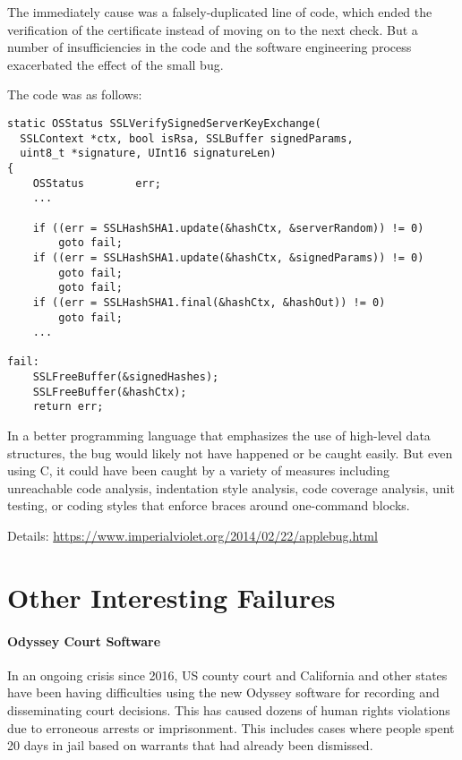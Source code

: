 The immediately cause was a falsely-duplicated line of code, which ended the verification of the certificate instead of moving on to the next check.
But a number of insufficiencies in the code and the software engineering process exacerbated the effect of the small bug.

The code was as follows:

\begin{lstlisting}
static OSStatus SSLVerifySignedServerKeyExchange(
  SSLContext *ctx, bool isRsa, SSLBuffer signedParams,
  uint8_t *signature, UInt16 signatureLen)
{
	OSStatus        err;
	...

	if ((err = SSLHashSHA1.update(&hashCtx, &serverRandom)) != 0)
		goto fail;
	if ((err = SSLHashSHA1.update(&hashCtx, &signedParams)) != 0)
		goto fail;
		goto fail;
	if ((err = SSLHashSHA1.final(&hashCtx, &hashOut)) != 0)
		goto fail;
	...

fail:
	SSLFreeBuffer(&signedHashes);
	SSLFreeBuffer(&hashCtx);
	return err;
\end{lstlisting}

In a better programming language that emphasizes the use of high-level data structures, the bug would likely not have happened or be caught easily.
But even using C, it could have been caught by a variety of measures including unreachable code analysis, indentation style analysis, code coverage analysis, unit testing, or coding styles that enforce braces around one-command blocks.
 
Details: \url{https://www.imperialviolet.org/2014/02/22/applebug.html}


\section{Other Interesting Failures}

\paragraph{Odyssey Court Software}
In an ongoing crisis since 2016, US county court and California and other states have been having difficulties using the new Odyssey software for recording and disseminating court decisions.
This has caused dozens of human rights violations due to erroneous arrests or imprisonment.
This includes cases where people spent 20 days in jail based on warrants that had already been dismissed.


